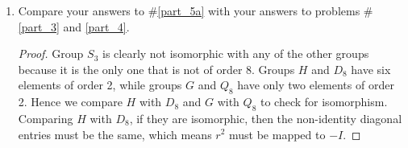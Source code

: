 \documentclass{article}
\begin{document}
\begin{enumerate}
\begin{enumerate}
\begin{proof}
          Finally, the group table for $Q_8$ is as follows:
          \begin{center}
            \begin{tabular}{|c||c|c|c|c|c|c|c|c|}
              \hline
              $Q_8$     & $1$   & $-1$  & $i$     & $-i$  & $j$   & $-j$  & $k$     & $-k$ \\
              \hline\hline
              $1$       & $1$   & $-1$  & $i$     & $-i$  & $j$   & $-j$  & $k$     & $-k$ \\
              \hline
              $-1$      & $-1$  & $1$   & $-i$    & $i$   & $-j$  & $j$   & $-k$    & $k$ \\
              \hline
              $i$       & $i$   & $-i$  & $-1$    & $1$   & $k$   & $-k$  & $-j$    & $j$ \\
              \hline
              $-i$      & $-i$  & $i$   & $1$     & $-1$  & $-k$  & $k$   & $j$     & $-j$ \\
              \hline
              $j$       & $j$   & $-j$  & $-k$    & $k$   & $-1$  & $1$   & $i$     & $-i$ \\
              \hline
              $-j$      & $-j$  & $j$   & $k$     & $-k$  & $1$   & $-1$  & $-i$    & $i$ \\
              \hline
              $k$       & $k$   & $-k$  & $j$     & $-j$  & $-i$  & $i$   & $-1$    & $1$ \\
              \hline
              $-k$      & $-k$  & $k$   & $-j$    & $j$   & $i$   & $-i$  & $1$     & $-1$ \\
              \hline
            \end{tabular}
          \end{center}
        \end{proof}
      \item Compare your answers to \#\ref{part_5a} with your answers to
        problems \#\ref{part_3} and \ref{part_4}.
        \begin{proof}
          Group $S_3$ is clearly not isomorphic with any of the other
          groups because it is the only one that is not of order 8. Groups
          $H$ and $D_8$ have six elements of order 2, while groups $G$ and
          $Q_8$ have only two elements of order 2. Hence we compare $H$
          with $D_8$ and $G$ with $Q_8$ to check for isomorphism. \\

          Comparing $H$ with $D_8$, if they are isomorphic, then the
          non-identity diagonal entries must be the same, which means $r^2$
          must be mapped to $-I$.


\end{proof}
\end{enumerate}
\end{enumerate}
\end{document}
